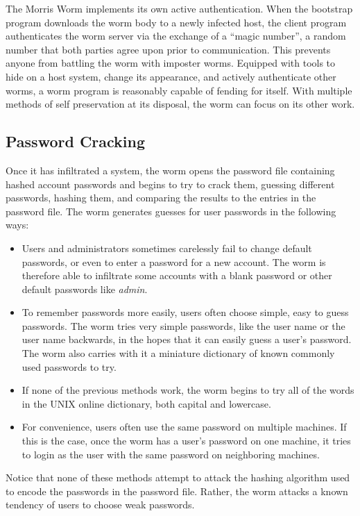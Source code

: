 The Morris Worm implements its own active authentication.
When the bootstrap program downloads the worm body to a newly infected host, the client
program authenticates the worm server via the exchange of a ``magic number'', a
random number that both parties agree upon prior to communication. 
This prevents anyone from battling the worm with imposter worms. Equipped with
tools to hide on a host system, change its appearance, and actively authenticate
other worms, a worm program is reasonably capable of fending for itself.  With
multiple methods of self preservation at its disposal, the worm can focus on
its other work.

\subsection*{Password Cracking}
Once it has infiltrated a system, the worm opens the password file
containing hashed account passwords and begins to try to crack them, guessing
different passwords, hashing them, and comparing the results to the entries in
the password file. The worm generates guesses for user passwords in the
following ways:

\begin{itemize}
\item Users and administrators sometimes carelessly fail to change
default passwords, or even to enter a password for a new account. The worm is
therefore able to infiltrate some accounts with a blank password or other
default passwords like \textit{admin}.
\item To remember passwords more easily, users often choose simple, easy to
guess passwords. The worm tries very simple passwords, like the user name or the
user name backwards, in the hopes that it can easily guess a user's
password. The worm also carries with it a miniature dictionary of
known commonly used passwords to try. 
\item If none of the previous methods work, the worm begins to try all
of the words in the UNIX online dictionary, both capital and lowercase.
\item For convenience, users often use the same password on multiple
machines. If this is the case, once the worm has a user's password on one
machine, it tries to login as the user with the same password on neighboring
machines.
\end{itemize}

Notice that none of these methods attempt to attack the hashing algorithm used
to encode the passwords in the password file. Rather, the worm attacks a known
tendency of users to choose weak passwords.



